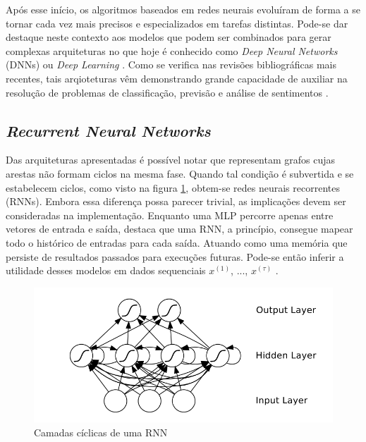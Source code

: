 Após esse início, os algoritmos baseados em redes neurais evoluíram de forma a se tornar cada vez mais precisos e especializados em tarefas distintas.
Pode-se dar destaque neste contexto aos modelos
que podem ser combinados para gerar complexas arquiteturas no que hoje é conhecido como \textit{Deep Neural Networks} (DNNs) ou \textit{Deep Learning} \cite{Good}. Como se verifica nas revisões bibliográficas mais recentes, tais arqioteturas vêm demonstrando grande capacidade de auxiliar na resolução de problemas de classificação, previsão e análise de sentimentos \cite{Hanc}.

\subsection{\textit{Recurrent Neural Networks}} \label{sec:rnn}

Das arquiteturas apresentadas é possível notar que representam grafos cujas arestas não formam ciclos na mesma fase.
Quando tal condição é subvertida e se estabelecem ciclos, como visto na figura \ref{figura:rnn}, obtem-se redes neurais recorrentes (RNNs)\cite{graves}.
Embora essa diferença possa parecer trivial, as implicações devem ser consideradas na implementação.
Enquanto uma MLP percorre apenas entre vetores de entrada e saída, \textcite{graves} destaca que uma RNN, a princípio, consegue mapear todo o histórico de entradas para cada saída. Atuando como uma memória que persiste de resultados passados para execuções futuras. 
Pode-se então inferir a utilidade desses modelos em dados sequenciais $x^{(1)}$, ..., $x^{(\tau)}$ \cite{Good}.

\begin{figure}[!htb] \centering
  \caption{Camadas cíclicas de uma RNN} \label{figura:rnn}
  \begin{varwidth}{\linewidth}
    \includegraphics[width=12cm]{figuras/rnn.png}
  \end{varwidth}
\end{figure}


